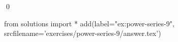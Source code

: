 \begin{ex}
  \label{ex:power-series-9}
  
  \qed
\end{ex}
\begin{python0}
from solutions import *
add(label="ex:power-series-9",
    srcfilename='exercises/power-series-9/answer.tex') 
\end{python0}                              
